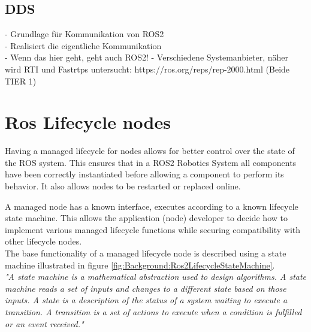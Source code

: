 	

	\subsection{DDS}
	\label{Grundlagen:DDS}
		- Grundlage für Kommunikation von ROS2\\
		- Realisiert die eigentliche Kommunikation\\
		- Wenn das hier geht, geht auch ROS2!
		- Verschiedene Systemanbieter, näher wird RTI und Fastrtps untersucht: https://ros.org/reps/rep-2000.html  (Beide TIER 1)
		
	
	\section{Ros Lifecycle nodes}
	\label{Grundlagen:ROS2:Lifecycle}
	Having a managed lifecycle for nodes allows for better control over the state of the ROS system. This ensures that in a ROS2 Robotics System all components have been correctly instantiated before allowing a component to perform its behavior. It also allows nodes to be restarted or replaced online.

	A managed node has a known interface, executes according to a known lifecycle state machine. This allows the application (node) developer to decide how to implement various managed lifecycle functions while securing compatibility with other lifecycle nodes.\\
	
	The base functionality of a managed lifecycle node is described using a state machine illustrated in figure \ref*{fig:Background:Ros2LifecycleStateMachine}.\\

	\textit{"A state machine is a mathematical abstraction used to design algorithms. A state machine reads a set of inputs and changes to a different state based on those inputs. A state is a description of the status of a system waiting to execute a transition. A transition is a set of actions to execute when a condition is fulfilled or an event received."} \cite*{statemachineDef}\\

